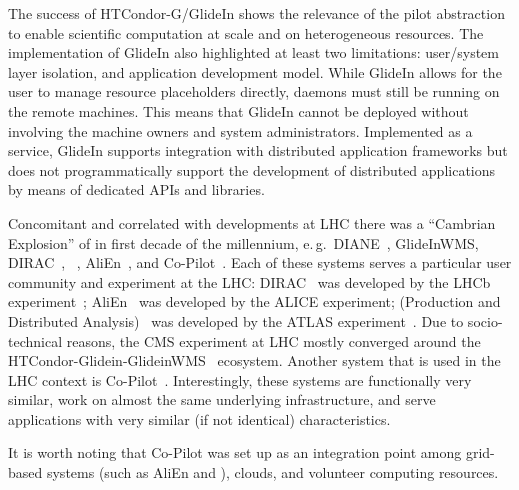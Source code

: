 \documentclass{sig-alternate}
\begin{document}

The success of HTCondor-G/GlideIn shows the relevance of the pilot abstraction
to enable scientific computation at scale and on heterogeneous resources. The
implementation of GlideIn also highlighted at least two limitations: user/system
layer isolation, and application development model. While GlideIn allows for the
user to manage resource placeholders directly, daemons must still be running on
the remote machines. This means that GlideIn cannot be deployed without
involving the machine owners and system administrators. Implemented as a
service, GlideIn supports integration with distributed application frameworks
but does not programmatically support the development of distributed
applications by means of dedicated APIs and libraries.

Concomitant and correlated with developments at LHC there was a ``Cambrian
Explosion'' of \pilotjobs in first decade of the millennium, e.\,g.\
DIANE~\cite{moscicki2003diane}, GlideInWMS, DIRAC~\cite{casajus2010dirac},
\panda~\cite{zhao2011panda}, AliEn~\cite{saiz2003alien}, and
Co-Pilot~\cite{buncicco2011co}.  Each of these \pilotjob systems serves a
particular user community and experiment at the LHC:
DIRAC~\cite{casajus2010dirac} was developed by the LHCb
experiment~\cite{lhcb_url}; AliEn~\cite{saiz2003alien} was developed by the
ALICE experiment; \panda (Production and Distributed
Analysis)~\cite{zhao2011panda} was developed by the ATLAS
experiment~\cite{aad2008atlas}. Due to socio-technical reasons, the CMS
experiment at LHC mostly converged around the
HTCondor-Glidein-GlideinWMS~\cite{sfiligoi2008glideinwms} ecosystem.  Another
\pilotjob system that is used in the LHC context is
Co-Pilot~\cite{buncicco2011co}. Interestingly, these systems are functionally
very similar, work on almost the same underlying infrastructure, and serve
applications with very similar (if not identical) characteristics.

It is worth noting that Co-Pilot was set up as an integration point among
grid-based \pilotjob systems (such as AliEn and \panda), clouds, and volunteer
computing resources.

\end{document}
